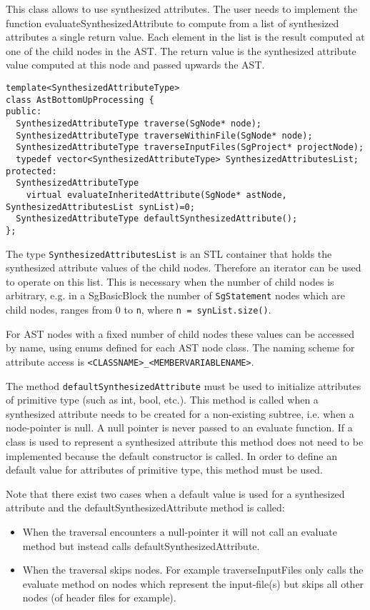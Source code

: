 This class allows to use synthesized attributes. The user needs to
implement the function evaluateSynthesizedAttribute to compute from a
list of synthesized attributes a single return value. Each element in the list is the result computed at one of the child nodes in the AST. 
The return value is the synthesized attribute value computed at this node and passed upwards the AST.

\begin{verbatim}
template<SynthesizedAttributeType>
class AstBottomUpProcessing {
public:
  SynthesizedAttributeType traverse(SgNode* node);
  SynthesizedAttributeType traverseWithinFile(SgNode* node);
  SynthesizedAttributeType traverseInputFiles(SgProject* projectNode);
  typedef vector<SynthesizedAttributeType> SynthesizedAttributesList;
protected:
  SynthesizedAttributeType
    virtual evaluateInheritedAttribute(SgNode* astNode, SynthesizedAttributesList synList)=0;
  SynthesizedAttributeType defaultSynthesizedAttribute();
};
\end{verbatim}

The type {\tt SynthesizedAttributesList} is an STL container that holds the synthesized attribute values of the child nodes. Therefore an iterator can be used to operate on this list. This is necessary when the number of child nodes is arbitrary, e.g. in a SgBasicBlock the number of {\tt SgStatement} nodes which are child nodes, ranges from 0 to {\tt n}, where {\tt n = synList.size()}.

For AST nodes with a fixed number of child nodes these values can be accessed by name, using enums defined for each AST node class. The naming scheme for attribute access is {\tt <CLASSNAME>\_<MEMBERVARIABLENAME>}.

The method {\tt defaultSynthesizedAttribute} must be used to initialize attributes of primitive type (such as int, bool, etc.).  This method is called when a synthesized attribute needs to be created for a non-existing subtree, i.e. when a node-pointer is null. A null pointer is never passed to an evaluate function. If a class is used to represent a synthesized attribute this method does not need to be implemented because the default constructor is called. In order to define an default value for attributes of primitive type, this method must be used.

Note that there exist two cases when a default value is used for a synthesized attribute and the defaultSynthesizedAttribute method is called:

\begin{itemize}
\item When the traversal encounters a null-pointer it will not call an evaluate method but instead calls defaultSynthesizedAttribute.
\item When the traversal skips nodes. For example traverseInputFiles only calls the evaluate method on nodes which represent the input-file(s) but skips all other nodes (of header files for example).
\end{itemize}

